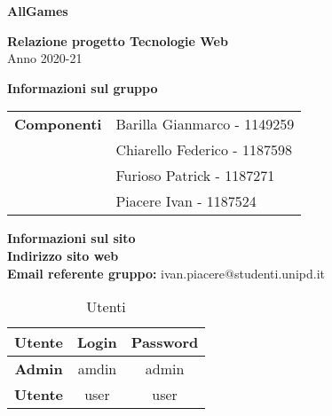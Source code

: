 \begin{center}
	\textbf{\Huge{AllGames}}\\
	\vspace{15pt}
\end{center}

\vspace{1.5cm}

\begin{center}
	\textbf{\huge{Relazione progetto Tecnologie Web}}\\[0.2cm]
	\Large{Anno 2020-21}
\end{center}

\vspace{5pt}

\begin{center}
	\textbf{\Large{Informazioni sul gruppo}}
\begin{table}[H]
	\hspace{3.5cm}
	\renewcommand{\arraystretch}{1.4}
	\begin{tabular}{l | l}
		\textbf{Componenti} & Barilla Gianmarco - 1149259\\
		& Chiarello Federico - 1187598\\
		& Furioso Patrick - 1187271\\
		& Piacere Ivan - 1187524\\
	\end{tabular}
\end{table}
\end{center}

\hspace{5pt}

\begin{center}
	\textbf{\Large{Informazioni sul sito}}\\
	\textbf{Indirizzo sito web} \url{}\\
	\textbf{Email referente gruppo:} ivan.piacere@studenti.unipd.it
	\renewcommand{\arraystretch}{1.8}
	\begin{longtable}{c c c}
		\caption{Utenti}\\
		\rowcolor[HTML]{FF9933}
		\textbf{Utente} & \textbf{Login} & \textbf{Password} \\
		\endhead
		\textbf{Admin} & amdin & admin\\
		\textbf{Utente} & user & user\\
	\end{longtable}
\end{center}

